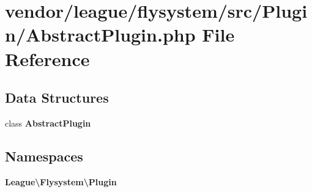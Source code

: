 \section{vendor/league/flysystem/src/\+Plugin/\+Abstract\+Plugin.php File Reference}
\label{_abstract_plugin_8php}
\subsection*{Data Structures}
\begin{DoxyCompactItemize}
\item 
class {\bf Abstract\+Plugin}
\end{DoxyCompactItemize}
\subsection*{Namespaces}
\begin{DoxyCompactItemize}
\item 
 {\bf League\textbackslash{}\+Flysystem\textbackslash{}\+Plugin}
\end{DoxyCompactItemize}
